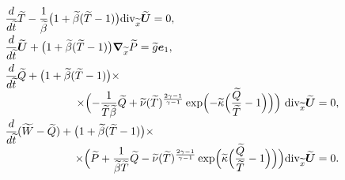 \begin{equation}

\label{lukashev:Eu1}

\begin{array}{l}

\displaystyle 

\frac{d}{d\widetilde{t}} \widetilde{T}-\frac1{\widetilde{\beta}}\bigl(1+\widetilde{\beta}(\widetilde{T}-1)\bigr) {\mathop{\rm div}\nolimits}_{\widetilde{x}} \widetilde{\boldsymbol U}=0,

\hspace{5cm}

\phantom{0}

\\[3mm]

\displaystyle 

\frac{d}{d\widetilde{t}} \widetilde{\boldsymbol  U}+

\bigl(1+\widetilde{\beta}(\widetilde{T}-1)\bigr) \boldsymbol \nabla_{\widetilde{x}} \widetilde{P}=\widetilde{g} \boldsymbol  e_1,

\\[3mm]

\displaystyle 

\frac{d}{d\widetilde{t}} \widetilde{Q}+ \bigl(1+\widetilde{\beta} (\widetilde{T}-1)\bigr)

\times

\\

\displaystyle \hfill

\times

\Bigl(-\frac{1}{\widetilde{T} \widetilde{\beta}} \widetilde{Q}+\widetilde{\nu}

(\widetilde{T})^{\frac{2\gamma-1}{\gamma-1}}

 \exp

 \Bigl(-\widetilde{\kappa}\Bigl(\frac{\widetilde{Q}}{\widetilde{T}}-1\Bigr) \Bigr)

 \Bigr)~{\mathop{\rm div}\nolimits}_{\widetilde{x}} \widetilde{ \boldsymbol U}=0,

\\[3mm]

\displaystyle 

\frac{d}{d\widetilde{t}} (\widetilde{W}-\widetilde{Q})+

\bigl(1+\widetilde{\beta}(\widetilde{T}-1)\bigr) \times

\\

\displaystyle \hfill

\times

\Bigl(\widetilde{P}+\frac{1}{\widetilde{\beta}\widetilde{T}} \widetilde{Q}-\widetilde{\nu} (\widetilde{T})^{\frac{2\gamma-1}{\gamma-1}} 

\exp\Bigl(\widetilde{\kappa}\Bigl(\frac{\widetilde{Q}}{\widetilde{T}}-1\Bigr)

 \Bigr)\Bigr) {\mathop{\rm div}\nolimits}_{\widetilde{x}} \widetilde{\boldsymbol U}=0.

\end{array}

\end{equation}

